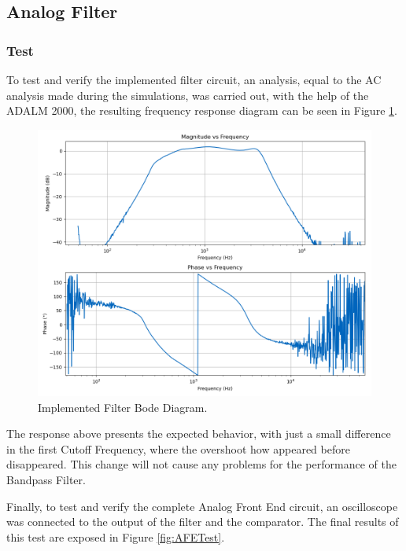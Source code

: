 \subsection{Analog Filter}

\subsubsection{Test}

To test and verify the implemented filter circuit, an analysis, equal to the AC analysis made during the simulations, was carried out, with the help of the ADALM 2000, the resulting frequency response diagram can be seen in Figure \ref{fig:AnalogFilterBodeScoppy}.

\begin{figure}[H]
    \centering
    \includegraphics*[scale = 0.5]{Images/AnalogFilterScoppyBode.png}
    \caption{Implemented Filter Bode Diagram.}
    \label{fig:AnalogFilterBodeScoppy}
\end{figure}

The response above presents the expected behavior, with just a small difference in the first Cutoff Frequency, where the overshoot how appeared before disappeared. This change will not cause any problems for the performance of the Bandpass Filter.

Finally, to test and verify the complete Analog Front End circuit, an oscilloscope was connected to the output of the filter and the comparator. The final results of this test are exposed in Figure \ref{fig:AFETest}.


